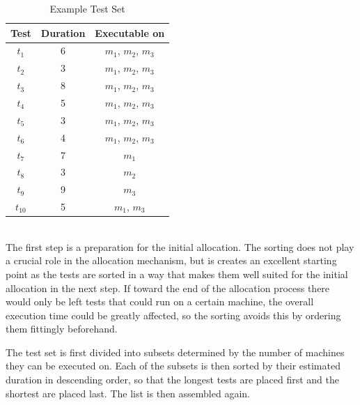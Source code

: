 \begin{table}[h!]
  \begin{tabular}{c c c}
    \hline
    \textbf{Test} & \textbf{Duration} & \textbf{Executable on}\\
    \hline
    $t_{1}$     &   6   &   $m_{1}$, $m_{2}$, $m_{3}$\\
    $t_{2}$     &   3   &   $m_{1}$, $m_{2}$, $m_{3}$\\
    $t_{3}$     &   8   &   $m_{1}$, $m_{2}$, $m_{3}$\\
    $t_{4}$     &   5   &   $m_{1}$, $m_{2}$, $m_{3}$\\
    $t_{5}$     &   3   &   $m_{1}$, $m_{2}$, $m_{3}$\\
    $t_{6}$     &   4   &   $m_{1}$, $m_{2}$, $m_{3}$\\
    $t_{7}$     &   7   &   $m_{1}$\\
    $t_{8}$     &   3   &   $m_{2}$\\
    $t_{9}$     &   9   &   $m_{3}$\\
    $t_{10}$    &   5   &   $m_{1}$, $m_{3}$\\
    \hline
  \end{tabular}
  \centering
  \caption{Example Test Set}
  \label{testsuite}
\end{table}


\noindent \textbf{}\\
\noindent The first step is a preparation for the initial allocation. The sorting does not play a crucial role in the allocation mechanism, but is creates an excellent starting point as the tests are sorted in a way that makes them well suited for the initial allocation in the next step. If toward the end of the allocation process there would only be left tests that could run on a certain machine, the overall execution time could be greatly affected, so the sorting avoids this by ordering them fittingly beforehand.

The test set is first divided into subsets determined by the number of machines they can be executed on. Each of the subsets is then sorted by their estimated duration in descending order, so that the longest tests are placed first and the shortest are placed last. The list is then assembled again.

